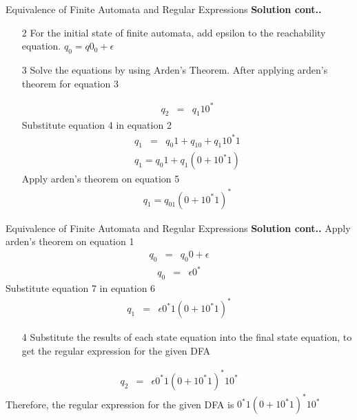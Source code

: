 \documentclass{beamer}
\begin{document}
\begin{frame}{Equivalence of Finite Automata and Regular Expressions}
	\textbf{Solution cont..}
	\begin{itemize}
		\item[2] For the initial state of finite automata, add epsilon to the 
		reachability equation.
		$q_0=q0_ 0 + \epsilon$
		\item[3] Solve the equations by using Arden’s Theorem.
		After applying arden’s theorem for equation 3

		\begin{eqnarray}
			q_2&=&q_1 10^*
		\end{eqnarray}
	Substitute equation 4 in equation 2
	\begin{eqnarray*}
	q_1&=& q_0 1 + q_10+q_1 10^*1
\end{eqnarray*}
	\begin{eqnarray}
q_1= q_0 1 + q_1(0+10^*1)
\end{eqnarray}
Apply arden’s theorem on equation 5
	\begin{eqnarray}
	q_1= q_01 (0+10^*1)^*
\end{eqnarray}
	\end{itemize}
\end{frame}
\begin{frame}{Equivalence of Finite Automata and Regular Expressions}
	\textbf{Solution cont..}
	Apply arden’s theorem on equation 1
	\begin{eqnarray*}
		q_0&=&q_0 0 + \epsilon
	\end{eqnarray*}
\begin{eqnarray}
	q_0&=& \epsilon 0^*
\end{eqnarray}
Substitute equation 7 in equation 6
\begin{eqnarray}
q_1&=& \epsilon 0^* 1 (0+10^*1)^*
\end{eqnarray}
\begin{itemize}
	\item[4] Substitute the results of each state equation into the final state 
	equation, to get the regular expression for the given DFA 
\end{itemize}
\begin{eqnarray}
	q_2&=& \epsilon 0^* 1 (0+10^*1)^* 10^*
\end{eqnarray}
Therefore, the regular expression for the given DFA is $0^* 1 (0+10^*1)^* 10^*$
\end{frame}
\end{document}
